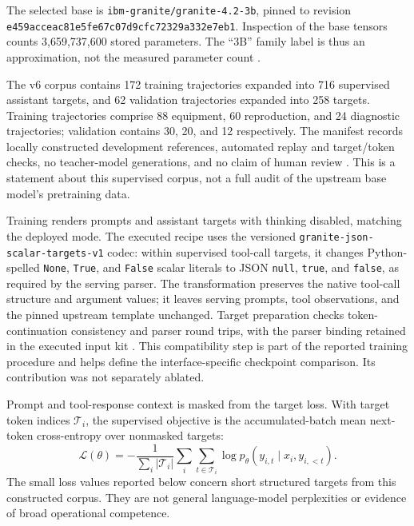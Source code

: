 \documentclass[11pt,letterpaper]{article}
\begin{document}
The selected base is \texttt{ibm-granite/granite-4.2-3b}, pinned to revision
\nolinkurl{e459acceac81e5fe67c07d9cfc72329a332e7eb1}. Inspection of the base tensors
counts 3,659,737,600 stored parameters. The ``3B'' family label is thus an
approximation, not the measured parameter count \cite{training}.

The v6 corpus contains 172 training trajectories expanded into 716 supervised
assistant targets, and 62 validation trajectories expanded into 258 targets.
Training trajectories comprise 88 equipment, 60 reproduction, and 24 diagnostic
trajectories; validation contains 30, 20, and 12 respectively. The manifest
records locally constructed development references, automated replay and
target/token checks, no teacher-model generations, and no claim of human review
\cite{dataset}. This is a statement about this supervised corpus, not a full
audit of the upstream base model's pretraining data.

Training renders prompts and assistant targets with thinking disabled, matching
the deployed mode. The executed recipe uses the versioned
\texttt{granite-json-scalar-targets-v1} codec: within supervised tool-call
targets, it changes Python-spelled \texttt{None}, \texttt{True}, and
\texttt{False} scalar literals to JSON \texttt{null}, \texttt{true}, and
\texttt{false}, as required by the serving parser. The transformation preserves
the native tool-call structure and argument values; it leaves serving prompts,
tool observations, and the pinned upstream template unchanged. Target
preparation checks token-continuation consistency and parser round trips, with
the parser binding retained in the executed input kit \cite{training,dataset}.
This compatibility step is part of the reported training procedure and helps
define the interface-specific checkpoint comparison. Its contribution was not
separately ablated.

Prompt and tool-response context is masked from the target loss. With target
token indices $\mathcal{T}_i$, the supervised objective is the accumulated-batch
mean next-token cross-entropy over nonmasked targets:
\[
\mathcal{L}(\theta)=
-\frac{1}{\sum_i|\mathcal{T}_i|}
\sum_i\sum_{t\in\mathcal{T}_i}
\log p_\theta(y_{i,t}\mid x_i,y_{i,<t}).
\]
The small loss values reported below concern short structured targets from
this constructed corpus. They are not general language-model perplexities
or evidence of broad operational competence.
\end{document}
